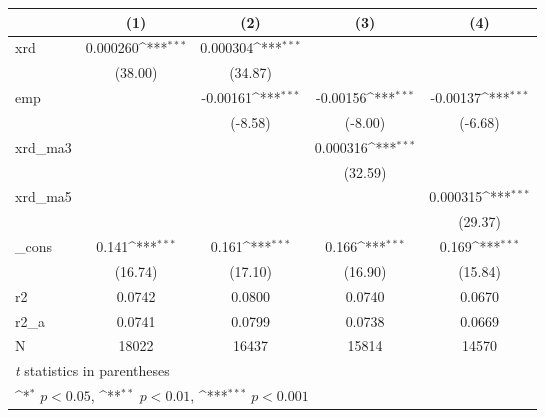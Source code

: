 {
\def\sym#1{\ifmmode^{#1}\else\(^{#1}\)\fi}
\begin{tabular}{l*{4}{c}}
\hline\hline
            &\multicolumn{1}{c}{(1)}         &\multicolumn{1}{c}{(2)}         &\multicolumn{1}{c}{(3)}         &\multicolumn{1}{c}{(4)}         \\
\hline
xrd         &    0.000260\sym{***}&    0.000304\sym{***}&                     &                     \\
            &     (38.00)         &     (34.87)         &                     &                     \\
[1em]
emp         &                     &    -0.00161\sym{***}&    -0.00156\sym{***}&    -0.00137\sym{***}\\
            &                     &     (-8.58)         &     (-8.00)         &     (-6.68)         \\
[1em]
xrd\_ma3     &                     &                     &    0.000316\sym{***}&                     \\
            &                     &                     &     (32.59)         &                     \\
[1em]
xrd\_ma5     &                     &                     &                     &    0.000315\sym{***}\\
            &                     &                     &                     &     (29.37)         \\
[1em]
\_cons      &       0.141\sym{***}&       0.161\sym{***}&       0.166\sym{***}&       0.169\sym{***}\\
            &     (16.74)         &     (17.10)         &     (16.90)         &     (15.84)         \\
\hline
r2          &      0.0742         &      0.0800         &      0.0740         &      0.0670         \\
r2\_a        &      0.0741         &      0.0799         &      0.0738         &      0.0669         \\
N           &       18022         &       16437         &       15814         &       14570         \\
\hline\hline
\multicolumn{5}{l}{\footnotesize \textit{t} statistics in parentheses}\\
\multicolumn{5}{l}{\footnotesize \sym{*} \(p<0.05\), \sym{**} \(p<0.01\), \sym{***} \(p<0.001\)}\\
\end{tabular}
}
